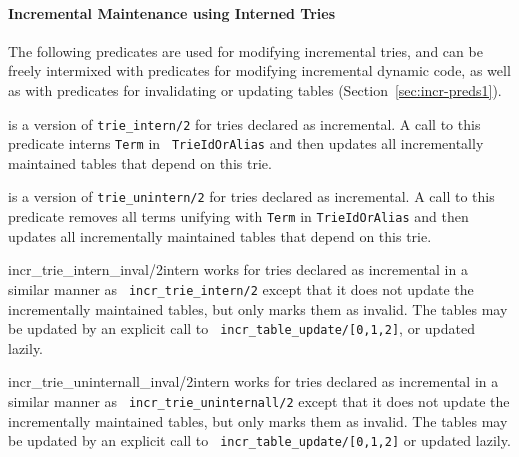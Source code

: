 \paragraph{Incremental Maintenance using Interned Tries}
The following predicates are used for modifying incremental tries, and
can be freely intermixed with predicates for modifying incremental
dynamic code, as well as with predicates for invalidating or updating
tables (Section~\ref{sec:incr-preds1}).

\begin{description}
%
is a version of {\tt trie\_intern/2} for tries declared as
incremental.  A call to this predicate interns {\tt Term} in {\tt
  TrieIdOrAlias} and then updates all incrementally maintained tables
that depend on this trie.

%
is a version of {\tt trie\_unintern/2} for tries declared as
incremental.  A call to this predicate removes all terms unifying with
{\tt Term} in {\tt TrieIdOrAlias} and then updates all incrementally
maintained tables that depend on this trie.

{incr\_trie\_intern\_inval/2}{intern}
%
works for tries declared as incremental in a similar manner as {\tt
  incr\_trie\_intern/2} except that it does not update the
incrementally maintained tables, but only marks them as invalid. The
tables may be updated by an explicit call to {\tt
  incr\_table\_update/[0,1,2]}, or updated lazily.

{incr\_trie\_uninternall\_inval/2}{intern}
%
works for tries declared as incremental in a similar manner as {\tt
  incr\_trie\_uninternall/2} except that it does not update the
incrementally maintained tables, but only marks them as invalid. The
tables may be updated by an explicit call to {\tt
  incr\_table\_update/[0,1,2]} or updated lazily.
\end{description}

